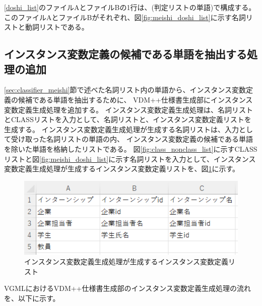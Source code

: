 \ref{doshi_list}のファイルAとファイルBの1行は、(判定リストの単語)で構成する。
このファイルAとファイルBがそれぞれ、図\ref{fig:meishi_doshi_list}に示す名詞リストと動詞リストである。

\subsection{インスタンス変数定義の候補である単語を抽出する処理の追加}
\ref{sec:classifier_meishi}節で述べた名詞リスト内の単語から、インスタンス変数定義の候補である単語を抽出するために、
VDM++仕様書生成部にインスタンス変数定義生成処理を追加する。
インスタンス変数定義生成処理は、名詞リストとCLASSリストを入力として、名詞リストと、インスタンス変数定義リストを生成する。
インスタンス変数定義生成処理が生成する名詞リストは、入力として受け取った名詞リストの単語の内、
インスタンス変数定義の候補である単語を除いた単語を格納したリストである。
図\ref{fig:class_nonclass_list}に示すCLASSリストと図\ref{fig:meishi_doshi_list}に示す名詞リストを入力として、インスタンス変数定義生成処理が生成するインスタンス変数定義リストを、図\ref{fig:instance_list}に示す。

\begin{figure}[t]
    \begin{center}
        \includegraphics[width=1.0\columnwidth]{image/instance_list.png}
        \caption{インスタンス変数定義生成処理が生成するインスタンス変数定義リスト}
        \label{fig:instance_list}
    \end{center}
\end{figure}

VGMLにおけるVDM++仕様書生成部のインスタンス変数定義生成処理の流れを、以下に示す。

